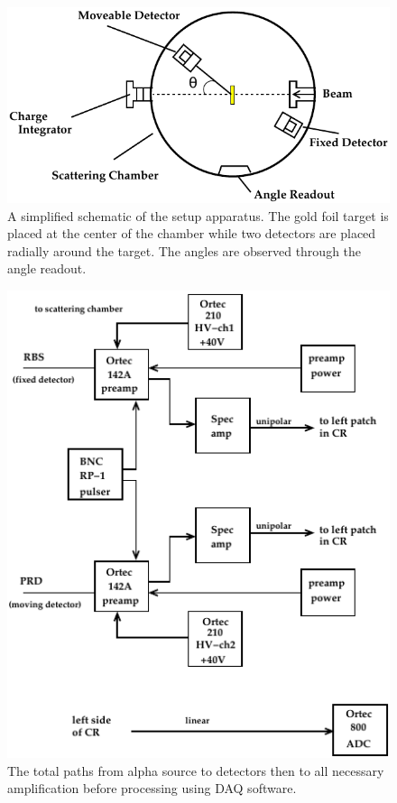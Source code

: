 \documentclass[10pt]{IEEEtran}
\begin{document}
\begin{figure}
       \begin{center}
       \includegraphics[width=\columnwidth]{setup.png}
       \caption{A simplified schematic of the setup apparatus. The gold foil target is placed at the center of the chamber while two detectors are placed radially around the target. The angles are observed through the angle readout\cite{blackboard}.}
       \label{fig:setup}
       \end{center}
\end{figure}

\begin{figure}
       \begin{center}
       \includegraphics[width=\columnwidth]{depth.png}
       \caption{The total paths from alpha source to detectors then to all necessary amplification before processing using DAQ software\cite{blackboard}.}
       \label{fig:depth}
       \end{center}
\end{figure}
\end{document}
